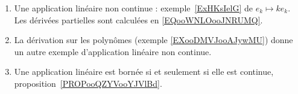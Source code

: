 
       \label{THEMEooYCBUooEnFdUg}
\begin{enumerate}
	\item
	      Une application linéaire non continue : exemple~\ref{ExHKsIelG} de \( e_k\mapsto ke_k\). Les dérivées partielles sont calculées en \eqref{EQooWNLOooJNRUMQ}.
	\item
	      La dérivation sur les polynômes (exemple \ref{EXooDMVJooAJywMU}) donne un autre exemple d'application linéaire non continue.
	\item
	      Une application linéaire est bornée si et seulement si elle est continue, proposition~\ref{PROPooQZYVooYJVlBd}.
\end{enumerate}
